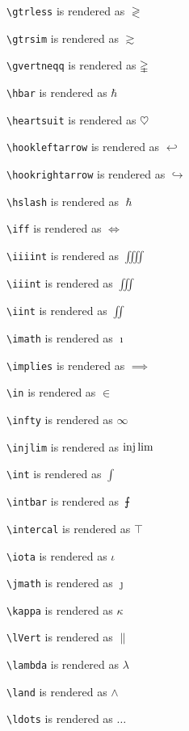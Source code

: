 \texttt{\textbackslash gtrless} is rendered as $\gtrless$

\texttt{\textbackslash gtrsim} is rendered as $\gtrsim$

\texttt{\textbackslash gvertneqq} is rendered as $\gvertneqq$

\texttt{\textbackslash hbar} is rendered as $\hbar$

\texttt{\textbackslash heartsuit} is rendered as $\heartsuit$

\texttt{\textbackslash hookleftarrow} is rendered as $\hookleftarrow$

\texttt{\textbackslash hookrightarrow} is rendered as $\hookrightarrow$

\texttt{\textbackslash hslash} is rendered as $\hslash$

\texttt{\textbackslash iff} is rendered as $\iff$

\texttt{\textbackslash iiiint} is rendered as $\iiiint$

\texttt{\textbackslash iiint} is rendered as $\iiint$

\texttt{\textbackslash iint} is rendered as $\iint$

\texttt{\textbackslash imath} is rendered as $\imath$

\texttt{\textbackslash implies} is rendered as $\implies$

\texttt{\textbackslash in} is rendered as $\in$

\texttt{\textbackslash infty} is rendered as $\infty$

\texttt{\textbackslash injlim} is rendered as $\injlim$

\texttt{\textbackslash int} is rendered as $\int$

\texttt{\textbackslash intbar} is rendered as $\intbar$

\texttt{\textbackslash intercal} is rendered as $\intercal$

\texttt{\textbackslash iota} is rendered as $\iota$

\texttt{\textbackslash jmath} is rendered as $\jmath$

\texttt{\textbackslash kappa} is rendered as $\kappa$

\texttt{\textbackslash lVert} is rendered as $\lVert$

\texttt{\textbackslash lambda} is rendered as $\lambda$

\texttt{\textbackslash land} is rendered as $\land$

\texttt{\textbackslash ldots} is rendered as $\ldots$

